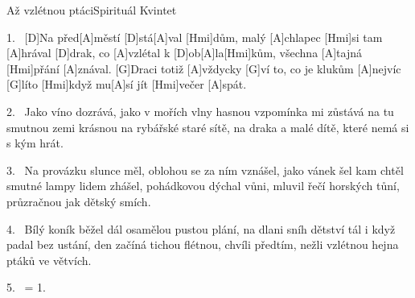 \begin{song}{Až vzlétnou ptáci}{Spirituál Kvintet}


\begin{xverse}{1.~}
[\large D]Na před[\large A]městí [\large D]stá[\large A]val [\large Hmi]dům, malý [\large A]chlapec [\large Hmi]si tam [\large A]hrával
[\large D]drak, co [\large A]vzlétal k [\large D]ob[\large A]la[\large Hmi]kům, všechna [\large A]tajná [\large Hmi]přání [\large A]znával.
[\large G]Draci totiž [\large A]vždycky [\large G]ví to, co je klukům [\large A]nejvíc [\large G]líto
[\large Hmi]když mu[\large A]sí jít [\large Hmi]večer [\large A]spát.
\end{xverse}

\begin{xverse}{2.~}
Jako víno dozrává, jako v mořích vlny hasnou
vzpomínka mi zůstává na tu smutnou zemi krásnou
na rybářské staré sítě, na draka a malé dítě,
které nemá si s kým hrát.
\end{xverse}

\begin{xverse}{3.~}
Na provázku slunce měl, oblohou se za ním vznášel,
jako vánek šel kam chtěl smutné lampy lidem zhášel,
pohádkovou dýchal vůni, mluvil řečí horských tůní,
průzračnou jak dětský smích.
\end{xverse}

\begin{xverse}{4.~}
Bílý koník běžel dál osamělou pustou plání,
na dlani sníh dětství tál i když padal bez ustání,
den začíná tichou flétnou, chvíli předtím, nežli vzlétnou
hejna ptáků ve větvích.
\end{xverse}

\begin{xverse}{5.~}
= 1.
\end{xverse}

\end{song}

